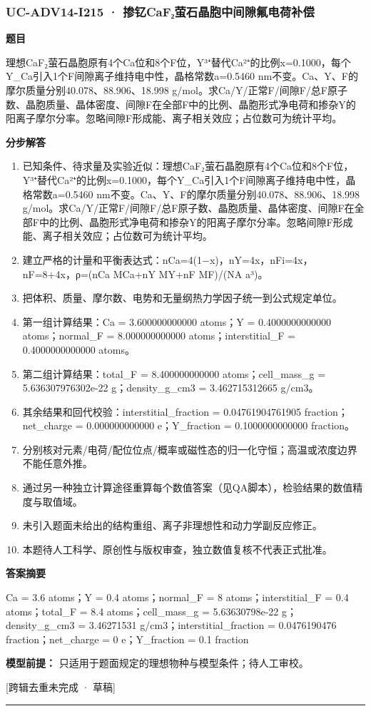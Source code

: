\documentclass[UTF8,11pt,a4paper]{ctexart}
\begin{document}
\subsubsection*{UC-ADV14-I215 · 掺钇CaF₂萤石晶胞中间隙氟电荷补偿}
\noindent\textbf{题目}\par
理想CaF₂萤石晶胞原有4个Ca位和8个F位，Y³⁺替代Ca²⁺的比例x=0.1000，每个Y\_Ca引入1个F间隙离子维持电中性，晶格常数a=0.5460 nm不变。Ca、Y、F的摩尔质量分别40.078、88.906、18.998 g/mol。求Ca/Y/正常F/间隙F/总F原子数、晶胞质量、晶体密度、间隙F在全部F中的比例、晶胞形式净电荷和掺杂Y的阳离子摩尔分率。忽略间隙F形成能、离子相关效应；占位数可为统计平均。\par
\medskip\noindent\textbf{分步解答}
\begin{enumerate}
\item 已知条件、待求量及实验近似：理想CaF₂萤石晶胞原有4个Ca位和8个F位，Y³⁺替代Ca²⁺的比例x=0.1000，每个Y\_Ca引入1个F间隙离子维持电中性，晶格常数a=0.5460 nm不变。Ca、Y、F的摩尔质量分别40.078、88.906、18.998 g/mol。求Ca/Y/正常F/间隙F/总F原子数、晶胞质量、晶体密度、间隙F在全部F中的比例、晶胞形式净电荷和掺杂Y的阳离子摩尔分率。忽略间隙F形成能、离子相关效应；占位数可为统计平均。
\item 建立严格的计量和平衡表达式：nCa=4(1−x)，nY=4x，nFi=4x，nF=8+4x，ρ=(nCa MCa+nY MY+nF MF)/(NA a³)。
\item 把体积、质量、摩尔数、电势和无量纲热力学因子统一到公式规定单位。
\item 第一组计算结果：Ca = 3.600000000000 atoms；Y = 0.4000000000000 atoms；normal\_F = 8.000000000000 atoms；interstitial\_F = 0.4000000000000 atoms。
\item 第二组计算结果：total\_F = 8.400000000000 atoms；cell\_mass\_g = 5.636307976302e-22 g；density\_g\_cm3 = 3.462715312665 g/cm3。
\item 其余结果和回代校验：interstitial\_fraction = 0.04761904761905 fraction；net\_charge = 0.000000000000 e；Y\_fraction = 0.1000000000000 fraction。
\item 分别核对元素/电荷/配位位点/概率或磁性态的归一化守恒；高温或浓度边界不能任意外推。
\item 通过另一种独立计算途径重算每个数值答案（见QA脚本），检验结果的数值精度与取值域。
\item 未引入题面未给出的结构重组、离子非理想性和动力学副反应修正。
\item 本题待人工科学、原创性与版权审查，独立数值复核不代表正式批准。
\end{enumerate}
\noindent\textbf{答案摘要}\par
Ca = 3.6 atoms；Y = 0.4 atoms；normal\_F = 8 atoms；interstitial\_F = 0.4 atoms；total\_F = 8.4 atoms；cell\_mass\_g = 5.63630798e-22 g；density\_g\_cm3 = 3.46271531 g/cm3；interstitial\_fraction = 0.0476190476 fraction；net\_charge = 0 e；Y\_fraction = 0.1 fraction\par
\noindent\textbf{模型前提：}
只适用于题面规定的理想物种与模型条件；待人工审校。\par
\noindent\textcolor{red!65!black}{[跨辑去重未完成 · 草稿]} \par
\medskip\hrule\medskip
{}
\end{document}
